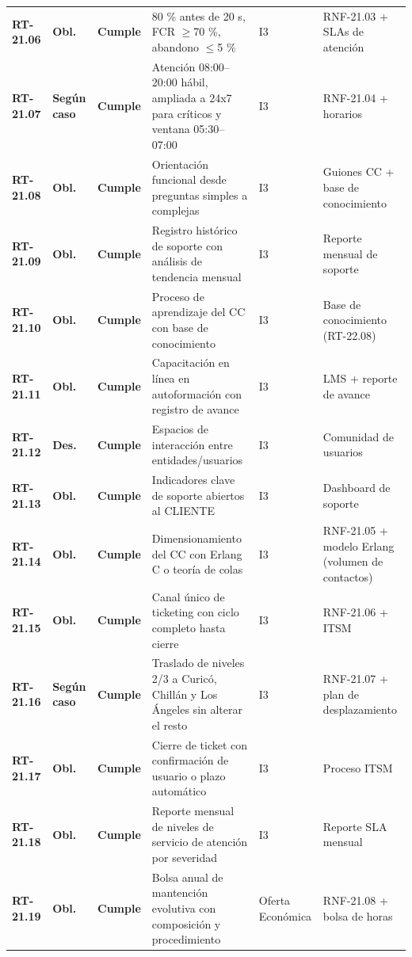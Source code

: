 \begin{small}
\begin{longtable}{@{}p{1.35cm} p{1.15cm} p{1.15cm} p{4.6cm} p{2.35cm} p{3.8cm}@{}}
\textbf{RT-21.06} & \textbf{Obl.} & \textbf{Cumple} & 80 \% antes de 20 s, FCR $\geq$70 \%, abandono $\leq$5 \% & I3 & RNF-21.03 + SLAs de atenci\'on \\
\textbf{RT-21.07} & \textbf{Según caso} & \textbf{Cumple} & Atenci\'on 08:00–20:00 h\'abil, ampliada a 24x7 para cr\'iticos y ventana 05:30–07:00 & I3 & RNF-21.04 + horarios \\
\textbf{RT-21.08} & \textbf{Obl.} & \textbf{Cumple} & Orientaci\'on funcional desde preguntas simples a complejas & I3 & Guiones CC + base de conocimiento \\
\textbf{RT-21.09} & \textbf{Obl.} & \textbf{Cumple} & Registro hist\'orico de soporte con an\'alisis de tendencia mensual & I3 & Reporte mensual de soporte \\
\textbf{RT-21.10} & \textbf{Obl.} & \textbf{Cumple} & Proceso de aprendizaje del CC con base de conocimiento & I3 & Base de conocimiento (RT-22.08) \\
\textbf{RT-21.11} & \textbf{Obl.} & \textbf{Cumple} & Capacitaci\'on en l\'inea en autoformaci\'on con registro de avance & I3 & LMS + reporte de avance \\
\textbf{RT-21.12} & \textbf{Des.} & \textbf{Cumple} & Espacios de interacci\'on entre entidades/usuarios & I3 & Comunidad de usuarios \\
\textbf{RT-21.13} & \textbf{Obl.} & \textbf{Cumple} & Indicadores clave de soporte abiertos al CLIENTE & I3 & Dashboard de soporte \\
\textbf{RT-21.14} & \textbf{Obl.} & \textbf{Cumple} & Dimensionamiento del CC con Erlang C o teor\'ia de colas & I3 & RNF-21.05 + modelo Erlang (volumen de contactos) \\
\textbf{RT-21.15} & \textbf{Obl.} & \textbf{Cumple} & Canal \'unico de ticketing con ciclo completo hasta cierre & I3 & RNF-21.06 + ITSM \\
\textbf{RT-21.16} & \textbf{Según caso} & \textbf{Cumple} & Traslado de niveles 2/3 a Curic\'o, Chill\'an y Los \'Angeles sin alterar el resto & I3 & RNF-21.07 + plan de desplazamiento \\
\textbf{RT-21.17} & \textbf{Obl.} & \textbf{Cumple} & Cierre de ticket con confirmaci\'on de usuario o plazo autom\'atico & I3 & Proceso ITSM \\
\textbf{RT-21.18} & \textbf{Obl.} & \textbf{Cumple} & Reporte mensual de niveles de servicio de atenci\'on por severidad & I3 & Reporte SLA mensual \\
\textbf{RT-21.19} & \textbf{Obl.} & \textbf{Cumple} & Bolsa anual de mantenci\'on evolutiva con composici\'on y procedimiento & Oferta Econ\'omica & RNF-21.08 + bolsa de horas \\

\end{longtable}
\end{small}
